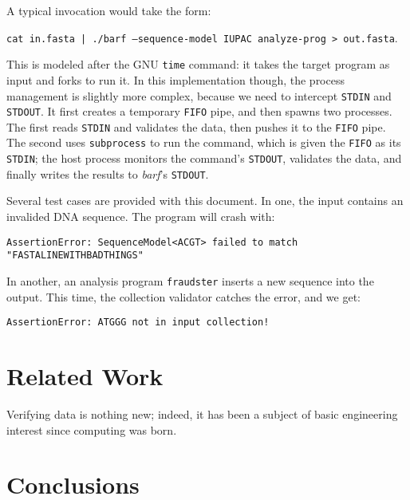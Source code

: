 \documentclass[12pt]{article} %
\newcommand{\code}[1]{\texttt{#1}}
\begin{document}
A typical invocation would take the form:

\begin{center}
\code{cat in.fasta | ./barf --sequence-model IUPAC analyze-prog > out.fasta}.
\end{center}

This is modeled after the GNU \texttt{time} command: it takes the target program
as input and forks to run it. In this implementation though, the process management
is slightly more complex, because we need to intercept \texttt{STDIN} and
\texttt{STDOUT}. It first creates a temporary \texttt{FIFO} pipe, and then spawns
two processes. The first reads \texttt{STDIN} and validates the data, then pushes it
to the \texttt{FIFO} pipe. The second uses \texttt{subprocess} to run the command,
which is given the \texttt{FIFO} as its \texttt{STDIN}; the host process monitors
the command's \texttt{STDOUT}, validates the data, and finally writes the results
to \emph{barf}'s \texttt{STDOUT}.

Several test cases are provided with this document. In one, the input contains an
invalided DNA sequence. The program will crash with:

\begin{center}
\code{AssertionError: SequenceModel<ACGT> failed to match "FASTALINEWITHBADTHINGS"}
\end{center}

In another, an analysis program \texttt{fraudster} inserts a new sequence into the
output. This time, the collection validator catches the error, and we get:

\begin{center}
\code{AssertionError: ATGGG not in input collection!}
\end{center}

\section{Related Work}

Verifying data is nothing new; indeed, it has been a subject of basic engineering
interest since computing was born. 

\section{Conclusions}



\end{document}
